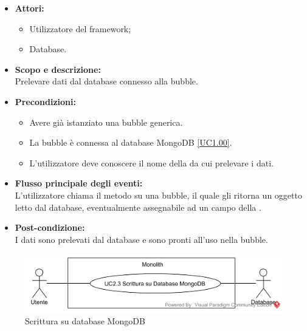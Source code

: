 \begin{itemize}
	\item \textbf{Attori:}
	\begin{itemize}
		\item Utilizzatore del framework;
		\item Database.
	\end{itemize}
	\item \textbf{Scopo e descrizione:} 
	\\Prelevare dati dal database connesso alla bubble.
	\item \textbf{Precondizioni:}
	\begin{itemize}
		\item Avere già istanziato una bubble generica.
		\item La bubble è connessa al database MongoDB \ref{UC1.00}.
		\item L'utilizzatore deve conoscere il nome della  da cui prelevare i dati.
	\end{itemize}
	\item \textbf{Flusso principale degli eventi:}
	\\L'utilizzatore chiama il metodo su una bubble, il quale gli ritorna un oggetto  letto dal database, eventualmente assegnabile ad un campo della .
	\item \textbf{Post-condizione:}
	\\I dati sono prelevati dal database e sono pronti all'uso nella bubble.
\end{itemize}

\begin{samepage}
\nopagebreak
\begin{figure}[H]
	\centering
	\includegraphics[width=15cm]{../../documenti/AnalisiDeiRequisiti/Diagrammi_img/usecase/uc1_02.png}
	\caption{\UCFCaption{} Scrittura su database MongoDB}
\end{figure}
\end{samepage}

